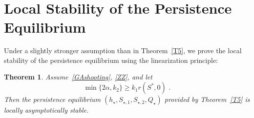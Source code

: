 \documentclass[reqno,11pt]{amsart}
\newtheorem{thm}{Theorem}[section]
\numberwithin{equation}{section}
\begin{document}
 



\section{Local Stability of the Persistence Equilibrium}\label{Sec5} 

Under a slightly stronger assumption than in Theorem~\ref{T5}, we prove the local stability of the persistence equilibrium using the linearization principle:

\begin{thm}\label{T6}
Assume~\eqref{GAshooting}, \eqref{ZZ}, and let
\begin{equation}\label{d1}
\min\{2\alpha,k_2\}\ge k_1r(S^*,0)\,\,.
\end{equation}
Then the persistence equilibrium $(h_\star,S_{\star,1},S_{\star,2},Q_\star)$ provided by Theorem~\ref{T5} is locally asymptotically stable.
\end{thm}


\end{document}
